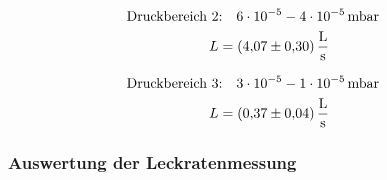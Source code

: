 \begin{align}
  \label{eq:turbo_leit_2}
  \begin{aligned}
    \text{Druckbereich 2} &\text{:}\quad \num{6e-5} - \num{4e-05} \, \text{mbar}& \\
   L&=\SI{4.07\pm 0.30}{\litre\per\second}
\end{aligned}
\end{align}

\begin{align}
  \label{eq:turbo_leit_3}
  \begin{aligned}
    \text{Druckbereich 3} &\text{:}\quad \num{3e-5} - \num{1e-05} \, \text{mbar}& \\
   L&=\SI{0.37\pm 0.04}{\litre\per\second}
\end{aligned}
\end{align}

\subsubsection{Auswertung der Leckratenmessung}
